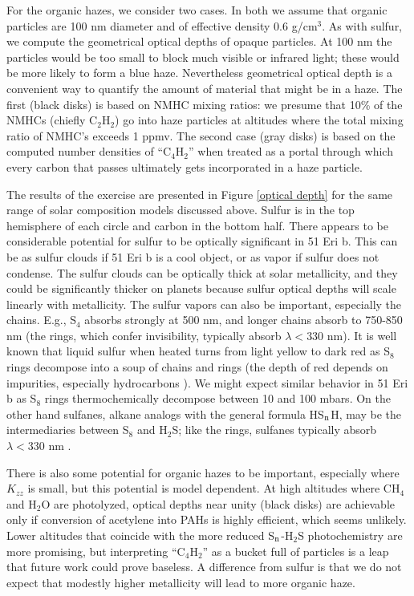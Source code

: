 \documentclass[preprint]{aastex}
\begin{document}
For the organic hazes, we consider two cases.
In both we assume that organic particles are 100 nm diameter and of effective density 0.6 g/cm$^3$. 
{\color{red} As with sulfur, we compute the geometrical optical depths of opaque particles.
At 100 nm the particles would be too small to block much visible or infrared light; these would be more likely
to form a blue haze.
Nevertheless geometrical optical depth is a convenient way to quantify the amount of material that might be in a haze. } 
The first (black disks) is based on NMHC mixing ratios:
we presume that 10\% of the NMHCs (chiefly C$_2$H$_2$) go into haze particles at altitudes where
the total mixing ratio of NMHC's exceeds 1 ppmv.
The second case (gray disks) is based on the computed number densities
of ``C$_4$H$_2$'' when treated as a portal through which every carbon that
passes ultimately gets incorporated in a haze particle. 

The results of the exercise are presented in Figure \ref{optical depth} for the same range of 
solar composition models discussed above. 
Sulfur is in the top hemisphere of each circle and carbon in the bottom half.
There appears to be considerable potential for sulfur to be optically significant in 51 Eri b.
This can be as sulfur clouds if 51 Eri b is a cool object, or as vapor  
if sulfur does not condense.  
The sulfur clouds can be optically thick at solar metallicity, and they could be significantly thicker on planets
 because sulfur optical depths will scale linearly with metallicity. 
The sulfur vapors can also be important, especially the chains.
E.g., S$_4$ absorbs strongly at 500 nm, and longer chains absorb 
 to 750-850 nm \citep{Meyer1976} (the rings, which confer invisibility, typically absorb $\lambda < 330$ nm).
 It is well known that liquid sulfur when heated turns from light yellow to dark red as S$_8$ rings
  decompose into a soup of chains and rings (the depth of red depends on impurities, especially hydrocarbons \citep{Moses1991}).   
 We might expect similar behavior in 51 Eri b as S$_8$ rings thermochemically decompose between 10 and 100 mbars.
 On the other hand sulfanes, alkane analogs with the general formula HS$_{\rm n}$H, may be the
 intermediaries between S$_8$ and H$_2$S; like the rings, sulfanes typically absorb $\lambda < 330$ nm \citep{Meyer1976}.
 
There is also some potential for organic hazes to be important, especially where $K_{zz}$ is small,
but this potential is model dependent.
At high altitudes where CH$_4$ and H$_2$O are photolyzed,
optical depths near unity (black disks) are achievable only if conversion of acetylene into PAHs is highly efficient,
which seems unlikely.  
Lower altitudes that coincide with the more reduced S$_{\rm n}$-H$_2$S photochemistry are more promising,
but interpreting ``C$_4$H$_2$'' as a bucket full of particles is a leap that future work could prove baseless.
A difference from sulfur is that we do not expect that modestly higher metallicity will lead to more organic haze. 
   
\end{document}
